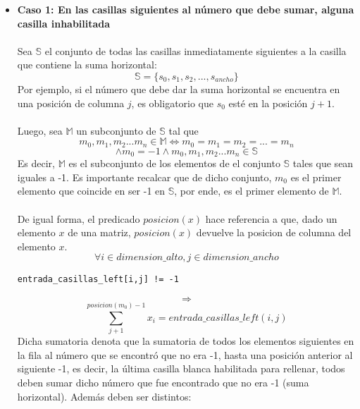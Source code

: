 \documentclass[12pt]{article}
\begin{document}
\begin{itemize}
\begin{itemize}
\begin{itemize}
\item \textbf{Caso 1: En las casillas siguientes al número que debe sumar, alguna casilla inhabilitada} \\ \\
Sea $\mathbb{S}$ el conjunto de todas las casillas inmediatamente siguientes a la casilla que contiene la suma horizontal:
\begin{equation*}
\mathbb{S} = \{s_0, s_1, s_2, ... , s_{ancho}\}
\end{equation*}
Por ejemplo, si el número que debe dar la suma horizontal se encuentra en una posición de columna $j$, es obligatorio que $s_0$ esté en la posición $j+1$.
\\ \\
Luego, sea $\mathbb{M}$ un subconjunto de $\mathbb{S}$ tal que
\begin{equation*}
m_0, m_1, m_2 ... m_n \in \mathbb{M} \Leftrightarrow m_0 = m_1 = m_2 = ... = m_n
\end{equation*}
\begin{equation*}
\land m_0 = -1 \land m_0, m_1, m_2 ... m_n \in \mathbb{S}
\end{equation*} 
Es decir, $\mathbb{M}$ es el subconjunto de los elementos de el conjunto $\mathbb{S}$ tales que sean iguales a -1. Es importante recalcar que de dicho conjunto, $m_0$ es el primer elemento que coincide en ser -1 en $\mathbb{S}$, por ende, es el primer elemento de $\mathbb{M}$.
\\ \\
De igual forma, el predicado $posicion(x)$ hace referencia a que, dado un elemento $x$ de una matriz, $posicion(x)$ devuelve la posicion de columna del elemento $x$.
\begin{equation*}
\forall i \in dimension\_alto, j \in dimension\_ancho
\end{equation*}
\begin{verbatim}
entrada_casillas_left[i,j] != -1
\end{verbatim}
\begin{equation*}
\Rightarrow
\end{equation*}
\begin{equation*}
\sum_{j+1}^{posicion(m_0)-1} x_{i} = entrada\_casillas\_left(i,j)
\end{equation*}
Dicha sumatoria denota que la sumatoria de todos los elementos siguientes en la fila al número que se encontró que no era -1, hasta una posición anterior al siguiente -1, es decir, la última casilla blanca habilitada para rellenar, todos deben sumar dicho número que fue encontrado que no era -1 (suma horizontal). Además deben ser distintos:

\end{itemize}
\end{itemize}
\end{itemize}
\end{document}
